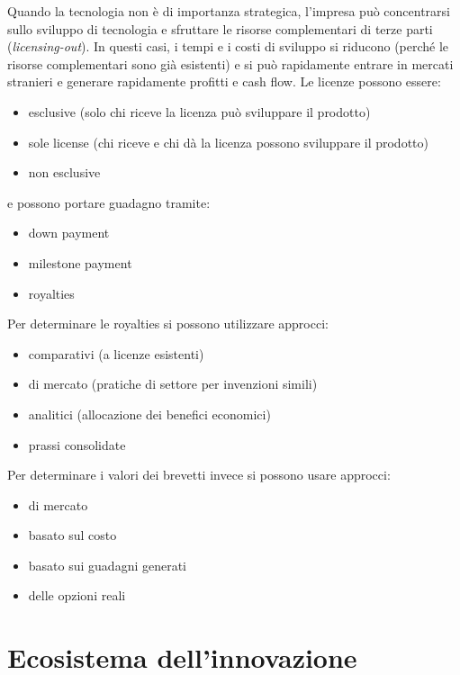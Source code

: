 \documentclass[answers, a4paper, 11pt]{exam}
\begin{document}
Quando la tecnologia non è di importanza strategica, l'impresa può concentrarsi sullo sviluppo di tecnologia e sfruttare le risorse complementari di terze parti (\emph{licensing-out}).
In questi casi, i tempi e i costi di sviluppo si riducono (perché le risorse complementari sono già esistenti) e si può rapidamente entrare in mercati stranieri e generare rapidamente profitti e cash flow. 
Le licenze possono essere:

\begin{itemize}
    \item esclusive (solo chi riceve la licenza può sviluppare il prodotto)
    \item sole license (chi riceve e chi dà la licenza possono sviluppare il prodotto)
    \item non esclusive
\end{itemize}

e possono portare guadagno tramite:

\begin{itemize}
    \item down payment
    \item milestone payment
    \item royalties
\end{itemize}

Per determinare le royalties si possono utilizzare approcci:

\begin{itemize}
    \item comparativi (a licenze esistenti)
    \item di mercato (pratiche di settore per invenzioni simili)
    \item analitici (allocazione dei benefici economici)
    \item prassi consolidate
\end{itemize}

Per determinare i valori dei brevetti invece si possono usare approcci:

\begin{itemize}
    \item di mercato
    \item basato sul costo 
    \item basato sui guadagni generati
    \item delle opzioni reali
\end{itemize}

\section{Ecosistema dell'innovazione}
\end{document}
